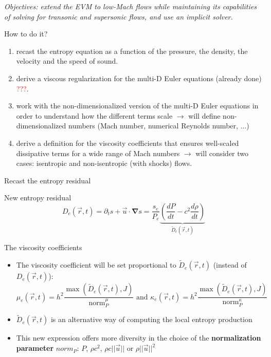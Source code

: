 \documentclass[xcolor=dvipsnames,10pt]{beamer}
\newcommand{\grad}{\boldsymbol{\nabla}}
\newcommand{\norm}{\textrm{norm}}
\newcommand{\tcr}[1]{\textcolor{red}{#1}}
\begin{document}
\begin{frame}
\emph{Objectives: extend the EVM to low-Mach flows while maintaining its capabilities of solving for transonic and supersonic flows, and use an implicit solver.}
\begin{block}{How to do it?}
\begin{enumerate}
\setlength{\itemsep}{10pt}
\item recast the entropy equation as a function of the pressure, the density, the velocity and the speed of sound.
\item derive a viscous regularization for the multi-D Euler equations (already done) \tcr{???}.
\item work with the non-dimensionalized version of the multi-D Euler equations in order to understand how the different terms scale $\to$ will define non-dimensionalized numbers (Mach number, numerical Reynolds number, $\dots$)
\item derive a definition for the viscosity coefficients that ensures well-scaled dissipative terms for a wide range of Mach numbers $\to$ will consider two cases: isentropic and non-isentropic (with shocks) flows.
\end{enumerate}
\end{block}
\end{frame}
\begin{frame}{Recast the entropy residual}
\begin{block}{New entropy residual}
\begin{equation}
D_e(\vec{r},t) = \partial_t s + \vec{u} \cdot \grad s = \frac{s_e}{P_e} \underbrace{\left( \frac{d P}{dt} - c^2 \frac{d \rho}{dt} \right)}_{\tilde{D}_e(\vec{r},t)} \nonumber
\end{equation}
\end{block}
\begin{block}{The viscosity coefficients}
\begin{itemize}
\item The viscosity coefficient will be set proportional to $\tilde{D}_e(\vec{r},t)$ (instead of $D_e(\vec{r},t)$):
\begin{equation}
\mu_e(\vec{r},t) = h^2 \frac{\max \left( \tilde{D}_e(\vec{r},t), J \right)}{\norm_P^\mu} \text{ and }\kappa_e(\vec{r},t) = h^2 \frac{\max \left( \tilde{D}_e(\vec{r},t), J \right)}{\norm_P^\kappa} \nonumber
\end{equation}
\item $\tilde{D}_e(\vec{r},t)$ is an alternative way of computing the local entropy production
\item This new expression offers more diversity in the choice of the \textbf{normalization parameter} $norm_P$: $P$, $\rho c^2$, $\rho c ||\vec{u} ||$ or  $\rho ||\vec{u}||^2$
\end{itemize}
\end{block}
\end{frame}
\end{document}
